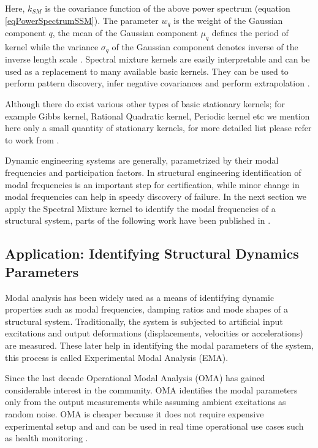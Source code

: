 Here, \(k_{SM}\) is the covariance function of the above power spectrum (equation \ref{eqPowerSpectrumSSM}). The parameter \(w_{q}\) is the weight of the Gaussian component \(q\), the mean of the Gaussian component \(\mu_{q}\) defines the period of kernel while the variance \(\sigma_{q}\) of the Gaussian component denotes inverse of the inverse length scale . Spectral mixture kernels are easily interpretable and can be used as a replacement to many available basic kernels. They can be used to perform pattern discovery, infer negative covariances and perform extrapolation \cite{wilson2014thesis}. 

Although there do exist various other types of basic stationary kernels; for example Gibbs kernel, Rational Quadratic kernel, Periodic kernel etc we mention here only a small quantity of stationary kernels, for more detailed list please refer to work from \cite{Rasmussen2005, duvenaud2013structure, wilson2014thesis}.

Dynamic engineering systems are generally, parametrized by their modal frequencies and participation factors. In structural engineering identification of modal frequencies is an important step for certification, while minor change in modal frequencies can help in speedy discovery of failure. In the next section we apply the Spectral Mixture kernel to identify the modal frequencies of a structural system, parts of the following work have been published in \cite{chiplunkar2017operational}.

\subsection{Application: Identifying Structural Dynamics Parameters}\label{subSecSMKernelApplication}
Modal analysis has been widely used as a means of identifying dynamic properties such as modal frequencies, damping ratios and mode shapes of a structural system. Traditionally, the system is subjected to artificial input excitations and output deformations (displacements, velocities or accelerations) are measured. These later help in identifying the modal parameters of the system, this process is called Experimental Modal Analysis (EMA). 

Since the last decade Operational Modal Analysis (OMA) has gained considerable interest in the community. OMA identifies the modal parameters only from the output measurements while assuming ambient excitations as random noise. OMA is cheaper because it does not require expensive experimental setup and and can be used in real time operational use cases such as health monitoring \cite{peeters2005industrial, shahdin2010correlating, rainieri2007automated}. 

